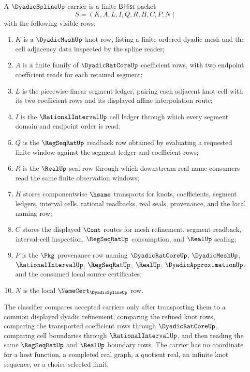 \begin{definition}
\label{def:dyadic-spline-finite-carrier}
A $\DyadicSplineUp$ carrier is a finite $\mathsf{BHist}$ packet
$$
S=(K,A,L,I,Q,R,H,C,P,N)
$$
with the following visible rows:
\begin{enumerate}
\item $K$ is a $\DyadicMeshUp$ knot row, listing a finite ordered dyadic mesh and the cell adjacency data inspected by the spline reader;
\item $A$ is a finite family of $\DyadicRatCoreUp$ coefficient rows, with two endpoint coefficient reads for each retained segment;
\item $L$ is the piecewise-linear segment ledger, pairing each adjacent knot cell with its two coefficient rows and its displayed affine interpolation route;
\item $I$ is the $\RationalIntervalUp$ cell ledger through which every segment domain and endpoint order is read;
\item $Q$ is the $\RegSeqRatUp$ readback row obtained by evaluating a requested finite window against the segment ledger and coefficient rows;
\item $R$ is the $\RealUp$ seal row through which downstream real-name consumers read the same finite observation windows;
\item $H$ stores componentwise $\hsame$ transports for knots, coefficients, segment ledgers, interval cells, rational readbacks, real seals, provenance, and the local naming row;
\item $C$ stores the displayed $\Cont$ routes for mesh refinement, segment readback, interval-cell inspection, $\RegSeqRatUp$ consumption, and $\RealUp$ sealing;
\item $P$ is the $\Pkg$ provenance row naming $\DyadicRatCoreUp$, $\DyadicMeshUp$, $\RationalIntervalUp$, $\RegSeqRatUp$, $\RealUp$, $\DyadicApproximationUp$, and the consumed local source certificates;
\item $N$ is the local $\NameCert_{\DyadicSplineUp}$ row.
\end{enumerate}
The classifier compares accepted carriers only after transporting them to a common displayed dyadic refinement, comparing the refined knot rows, comparing the transported coefficient rows through $\DyadicRatCoreUp$, comparing cell boundaries through $\RationalIntervalUp$, and then reading the same $\RegSeqRatUp$ and $\RealUp$ boundary rows. The carrier has no coordinate for a host function, a completed real graph, a quotient real, an infinite knot sequence, or a choice-selected limit.
\end{definition}

